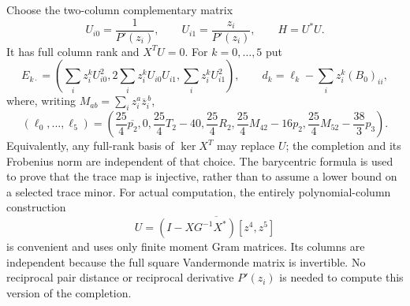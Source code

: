\documentclass[11pt]{article}
\theoremstyle{remark}
\numberwithin{equation}{section}
\begin{document}
Choose the two-column complementary matrix
\[
 U_{i0}=\frac1{P'(z_i)},\qquad
 U_{i1}=\frac{z_i}{P'(z_i)},\qquad H=U^*U.
\]
It has full column rank and $X^TU=0$. For $k=0,\ldots,5$ put
\[
 E_{k\cdot}=
 \left(\sum_i z_i^kU_{i0}^2,
       2\sum_i z_i^kU_{i0}U_{i1},
       \sum_i z_i^kU_{i1}^2\right),
 \qquad
 d_k=\ell_k-\sum_i z_i^k(B_0)_{ii},
\]
where, writing $M_{ab}=\sum_i z_i^a\overline z_i^{\,b}$,
\begin{equation}\label{eq:oct8-six-trace-data}
 (\ell_0,\ldots,\ell_5)=
 \left(\frac{25}4\overline{p_2},0,
       \frac{25}4T_2-40,\frac{25}4R_2,
       \frac{25}4M_{42}-16p_2,
       \frac{25}4M_{52}-\frac{38}3p_3\right).
\end{equation}
Equivalently, any full-rank basis of $\ker X^T$ may replace $U$;
the completion and its Frobenius norm are independent of that choice.
The barycentric formula is used to prove that the trace map is
injective, rather than to assume a lower bound on a selected trace minor.
For actual computation, the entirely polynomial-column construction
\[
 U=\overline{(I-XG^{-1}X^*)[z^4,z^5]}
\]
is convenient and uses only finite moment Gram matrices. Its columns
are independent because the full square Vandermonde matrix is invertible.
No reciprocal pair distance or reciprocal derivative $P'(z_i)$ is
needed to compute this version of the completion.
\end{document}
